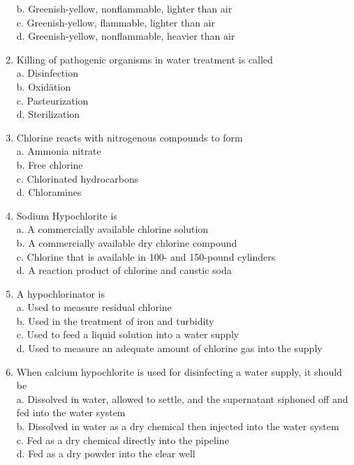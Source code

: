 \begin{enumerate}
b. Greenish-yellow, nonflammable, lighter than air\\
c. Greenish-yellow, flammable, lighter than air\\
d.  Greenish-yellow, nonflammable, heavier than air\\
  \item Killing of pathogenic organisms in water treatment is called\\
a. Disinfection\\
b. Oxidätion\\
c. Pasteurization\\
d. Sterilization\\
\item Chlorine reacts with nitrogenous compounds to form\\
a. Ammonia nitrate\\
b. Free chlorine\\
c. Chlorinated hydrocarbons\\
d. Chloramines\\
  \item Sodium Hypochlorite is\\
a. A commercially available chlorine solution\\
b. A commercially available dry chlorine compound\\
c. Chlorine that is available in 100- and 150-pound cylinders\\
d. A reaction product of chlorine and caustic soda\\
\item A hypochlorinator is\\
a. Used to measure residual chlorine\\
b. Used in the treatment of iron and turbidity\\
c. Used to feed a liquid solution into a water supply\\
d. Used to measure an adequate amount of chlorine gas into the supply\\
  \item When calcium hypochlorite is used for disinfecting a water supply, it should be\\
a.	 Dissolved in water, allowed to settle, and the supernatant siphoned off and fed into the water system\\
b. Dissolved in water as a dry chemical then injected into the water system\\
c. Fed as a dry chemical directly into the pipeline\\
d. Fed as a dry powder into the clear well\\

\end{enumerate}
